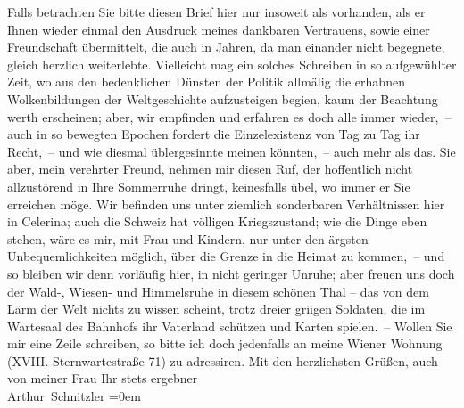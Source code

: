 \begin{ledgroupsized}[t]{13cm}
               Falls betrachten Sie bitte diesen Brief hier nur insoweit als vorhanden, als er Ihnen
               wieder einmal den Ausdruck meines dankbaren Vertrauens, sowie einer Freundschaft
               übermittelt, die auch in  Jahren, da man einander
               nicht begegnete, gleich herzlich weiterlebte.\pend
           \pstart
           Vielleicht mag ein solches Schreiben in so aufgewühlter Zeit, wo aus den bedenklichen
               Dünsten der Politik allmälig die erhabnen Wolkenbildun{\pb}gen der Weltgeschichte aufzusteigen begi{\geminationn}en, kaum der Beachtung werth erscheinen; aber, wir
               empfinden und erfahren es doch alle immer wieder, – auch in so bewegten Epochen
               fordert die Einzelexistenz von Tag zu Tag ihr Recht, – und wie diesmal üblergesinnte
               meinen könnten, – auch mehr als das. Sie aber, mein verehrter Freund, nehmen mir
               diesen Ruf, der hoffentlich nicht allzustörend in Ihre Sommerruhe dringt, keinesfalls
               übel, wo immer er Sie erreichen möge.\pend
           \pstart
           Wir befinden uns unter ziemlich sonderbaren Verhältnissen hier in Celerina; auch die Schweiz
               hat völligen Kriegszustand; wie die Dinge eben stehen, wäre es mir, mit Frau und Kindern, nur unter den ärgsten {\pb}Unbequemlichkeiten möglich, über die Grenze in die
               Heimat zu kommen, – und so bleiben wir denn vorläufig \introOben{}hier\introOben{},
               in nicht geringer Unruhe; aber freuen uns doch der Wald-, Wiesen- und Himmelsruhe in
               diesem schönen Thal – das von dem Lärm der Welt nichts zu wissen scheint, trotz
               dreier gri{\geminationm}igen Soldaten, die im Wartesaal des Bahnhofs
               ihr Vaterland schützen und Karten spielen. –\pend
           \pstart
           Wollen Sie mir eine Zeile schreiben, so bitte ich doch jedenfalls an meine Wiener Wohnung (XVIII. Sternwartestraße 71) zu adressiren.\pend
           \pstart
           Mit den herzlichsten Grüßen, auch von meiner Frau\pend
           \pstart
           Ihr stets ergebner{\\[\baselineskip]}\spacefill\mbox{Arthur Schnitzler}\pend
           \leftskip=0em{}
         
         \endnumbering{}\end{ledgroupsized}  \newcommand{\dateiname}{L02190}\newcommand{\titel}{Arthur Schnitzler an Georg Brandes, 3. 8. 1914}\newcommand{\editorInnen}{Martin Anton Müller und Gerd-Hermann Susen}
      